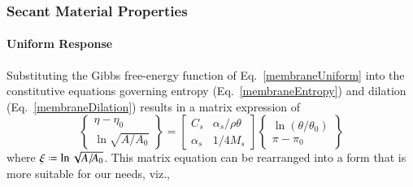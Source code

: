 \subsubsection{Secant Material Properties}

\paragraph{Uniform Response}

Substituting the Gibbs free-energy function of Eq.~\ref{membraneUniform} into the constitutive equations governing entropy (Eq.~\ref{membraneEntropy}) and dilation (Eq.~\ref{membraneDilation}) results in a matrix expression of
\begin{displaymath}
    \left\{ \begin{matrix} 
        \eta - \eta_0 \\ \ln \sqrt{A / \! A_0}
    \end{matrix} \right\} = \begin{bmatrix}
        C_s & \alpha_s / \rho \theta \\
        \alpha_s & 1 / 4 M_s
    \end{bmatrix} \left\{ \begin{matrix} 
        \ln ( \theta / \theta_0 ) \\ \pi - \pi_0
    \end{matrix} \right\}
\end{displaymath}
where $\xi \defeq \ln \sqrt{A / \! A_0}$.  This matrix equation can be rearranged into a form that is more suitable for our needs, viz.,
